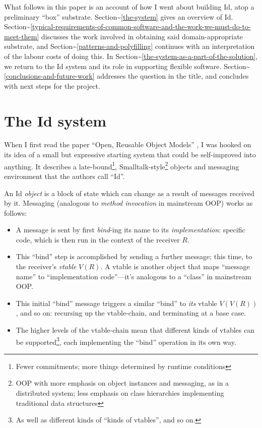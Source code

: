 What follows in this paper is an account of how I went about building
Id, atop a preliminary ``box'' substrate.
Section\textasciitilde{}\ref{the-system} gives an overview of Id.
Section\textasciitilde{}\ref{typical-requirements-of-common-software-and-the-work-we-must-do-to-meet-them}
discusses the work involved in obtaining said domain-appropriate
substrate, and Section\textasciitilde{}\ref{patterns-and-polyfilling}
continues with an interpretation of the labour costs of doing this. In
Section\textasciitilde{}\ref{the-system-as-a-part-of-the-solution}, we
return to the Id system and its role in supporting flexible software.
Section\textasciitilde{}\ref{conclusions-and-future-work} addresses the
question in the title, and concludes with next steps for the project.

\hypertarget{the-id-system}{%
\section{The Id system}\label{the-id-system}}

When I first read the paper ``Open, Reusable Object Models''
\cite{OROM}, I was hooked on its idea of a small but expressive starting
system that could be self-improved into anything. It describes a
late-bound\footnote{Fewer commitments; more things determined by runtime
  conditions}, Smalltalk-style\footnote{OOP with more emphasis on object
  instances and messaging, as in a distributed system; less emphasis on
  class hierarchies implementing traditional data structures} objects
and messaging environment that the authors call ``Id''.

An Id{} \emph{object} is a block of state which can change as a result
of messages received by it. Messaging (analogous to \emph{method
invocation} in mainstream OOP) works as follows:

\begin{itemize}
\tightlist
\item
  A message is sent by first \emph{bind}-ing its name to its
  \emph{implementation}: specific code, which is then run in the context
  of the receiver \(R\).
\item
  This ``bind'' step is accomplished by sending a further message; this
  time, to the receiver's \emph{vtable} \(V(R)\). A vtable is another
  object that maps ``message name'' to ``implementation code''---it's
  analogous to a ``class'' in mainstream OOP.
\item
  This initial ``bind'' message triggers a similar ``bind'' to
  \emph{its} vtable \(V(V(R))\), and so on: recursing up the
  vtable-chain, and terminating at a base case.
\item
  The higher levels of the vtable-chain mean that different kinds of
  vtables can be supported\footnote{As well as different kinds of
    ``kinds of vtables'', and so on.}, each implementing the ``bind''
  operation in its own way.
\end{itemize}

